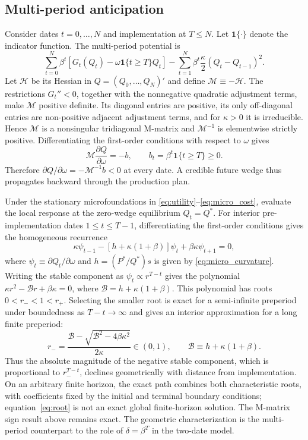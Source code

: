 \documentclass[11pt]{article}
\begin{document}
\subsection{Multi-period anticipation}
Consider dates $t=0,\ldots,N$ and implementation at $T\leq N$. Let $\mathbf{1}\{\cdot\}$ denote the indicator function. The multi-period potential is
\begin{equation}\label{eq:multi}
\sum_{t=0}^N\beta^t\left[G_t(Q_t)-\omega\mathbf{1}\{t\geq T\}Q_t\right]
-\sum_{t=1}^N\beta^t\frac{\kappa}{2}(Q_t-Q_{t-1})^2.
\end{equation}
Let $\mathcal H$ be its Hessian in $Q=(Q_0,\ldots,Q_N)'$ and define $\mathcal M\equiv-\mathcal H$. The restrictions $G_t''<0$, together with the nonnegative quadratic adjustment terms, make $\mathcal M$ positive definite. Its diagonal entries are positive, its only off-diagonal entries are non-positive adjacent adjustment terms, and for $\kappa>0$ it is irreducible. Hence $\mathcal M$ is a nonsingular tridiagonal M-matrix and $\mathcal M^{-1}$ is elementwise strictly positive. Differentiating the first-order conditions with respect to $\omega$ gives
\begin{equation*}
\mathcal M\frac{\partial Q}{\partial\omega}=-b,
\qquad b_t=\beta^t\mathbf{1}\{t\geq T\}\geq0.
\end{equation*}
Therefore $\partial Q/\partial\omega=-\mathcal M^{-1}b<0$ at every date. A credible future wedge thus propagates backward through the production plan.

Under the stationary microfoundations in \eqref{eq:utility}--\eqref{eq:micro_cost}, evaluate the local response at the zero-wedge equilibrium $Q_t=Q^*$. For interior pre-implementation dates $1\leq t\leq T-1$, differentiating the first-order conditions gives the homogeneous recurrence
\begin{equation*}
\kappa \psi_{t-1}-[h+\kappa(1+\beta)]\psi_t+\beta\kappa \psi_{t+1}=0,
\end{equation*}
where $\psi_t\equiv\partial Q_t/\partial\omega$ and $h=(P^*/Q^*)s$ is given by \eqref{eq:micro_curvature}. Writing the stable component as $\psi_t\propto r^{T-t}$ gives the polynomial $\kappa r^2-\mathcal B r+\beta\kappa=0$, where $\mathcal B=h+\kappa(1+\beta)$. This polynomial has roots $0<r_-<1<r_+$. Selecting the smaller root is exact for a semi-infinite preperiod under boundedness as $T-t\rightarrow\infty$ and gives an interior approximation for a long finite preperiod:
\begin{equation}\label{eq:root}
r_-=\frac{\mathcal B-\sqrt{\mathcal B^2-4\beta\kappa^2}}{2\kappa}\in(0,1),
\qquad \mathcal B\equiv h+\kappa(1+\beta).
\end{equation}
Thus the absolute magnitude of the negative stable component, which is proportional to $r_-^{T-t}$, declines geometrically with distance from implementation. On an arbitrary finite horizon, the exact path combines both characteristic roots, with coefficients fixed by the initial and terminal boundary conditions; equation~\eqref{eq:root} is not an exact global finite-horizon solution. The M-matrix sign result above remains exact. The geometric characterization is the multi-period counterpart to the role of $\delta=\beta^T$ in the two-date model.
\end{document}
